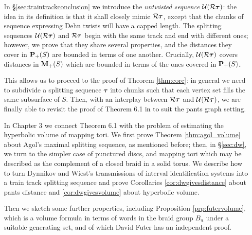 In \S \ref{sec:traintrackconclusion} we introduce the \emph{untwisted sequence} ${\mathcal U}({\mathcal R}\bm\tau)$: the idea in its definition is that it shall closely mimic ${\mathcal R}\bm\tau$, except that the chunks of sequence expressing Dehn twists will have a capped length. The splitting sequences ${\mathcal U}({\mathcal R}\bm\tau)$ and ${\mathcal R}\bm\tau$ begin with the same track and end with different ones; however, we prove that they share several properties, and the distances they cover in ${\mathbf{P}_+}(S)$ are bounded in terms of one another. Crucially, ${\mathcal U}({\mathcal R}\bm\tau)$ covers distances in ${\mathbf{M}_+}(S)$ which are bounded in terms of the ones covered in ${\mathbf{P}_+}(S)$.

This allows us to proceed to the proof of Theorem \ref{thm:core}: in general we need to subdivide a splitting sequence $\bm\tau$ into chunks such that each vertex set fills the same subsurface of $S$. Then, with an interplay between ${\mathcal R}\bm\tau$ and ${\mathcal U}({\mathcal R}\bm\tau)$, we are finally able to revisit the proof of Theorem 6.1 in \cite{mms} to suit the pants graph setting.

In Chapter 3 we connect Theorem 6.1 with the problem of estimating the hyperbolic volume of mapping tori. We first prove Theorem \ref{thm:agol_volume} about Agol's maximal splitting sequence, as mentioned before; then, in \S \ref{sec:dw}, we turn to the simpler case of punctured discs, and mapping tori which may be described as the complement of a closed braid in a solid torus. We describe how to turn Dynnikov and Wiest's transmissions of interval identification systems into a train track splitting sequence and prove Corollaries \ref{cor:dwgivesdistance} about pants distance and \ref{cor:dwgivesvolume} about hyperbolic volume.

Then we sketch some further properties, including Proposition \ref{prp:futervolume}, which is a volume formula in terms of words in the braid group $B_n$ under a suitable generating set, and of which David Futer has an independent proof.